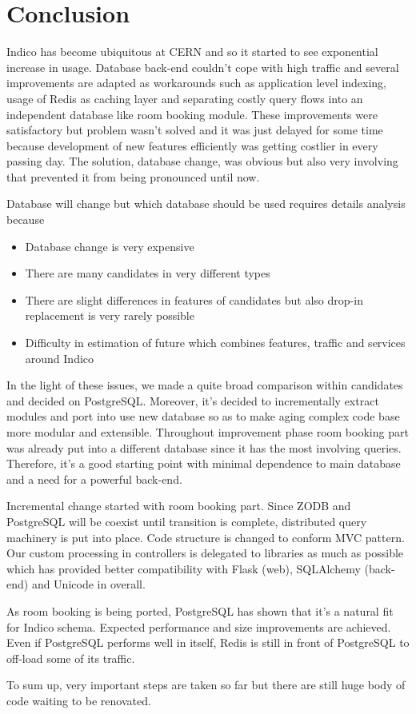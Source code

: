 \chapter{Conclusion}

Indico has become ubiquitous at CERN and so it started to see exponential increase in usage. Database back-end couldn't cope with high traffic and several improvements are adapted as workarounds such as application level indexing, usage of Redis as caching layer and separating costly query flows into an independent database like room booking module. These improvements were satisfactory but problem wasn't solved and it was just delayed for some time because development of new features efficiently was getting costlier in every passing day. The solution, database change, was obvious but also very involving that prevented it from being pronounced until now.

Database will change but which database should be used requires details analysis because 
\begin{itemize}
  \item Database change is very expensive
  \item There are many candidates in very different types
  \item There are slight differences in features of candidates but also drop-in replacement is very rarely possible
  \item Difficulty in estimation of future which combines features, traffic and services around Indico
\end{itemize}

In the light of these issues, we made a quite broad comparison within candidates and decided on PostgreSQL. Moreover, it's decided to incrementally extract modules and port into use new database so as to make aging complex code base more modular and extensible. Throughout improvement phase room booking part was already put into a different database since it has the most involving queries. Therefore, it's a good starting point with minimal dependence to main database and a need for a powerful back-end.

Incremental change started with room booking part. Since ZODB and PostgreSQL will be coexist until transition is complete, distributed query machinery is put into place. Code structure is changed to conform MVC pattern. Our custom processing in controllers is delegated to libraries as much as possible which has provided better compatibility with Flask (web), SQLAlchemy (back-end) and Unicode in overall. 

As room booking is being ported, PostgreSQL has shown that it's a natural fit for Indico schema. Expected performance and size improvements are achieved. Even if PostgreSQL performs well in itself, Redis is still in front of PostgreSQL to off-load some of its traffic.

To sum up, very important steps are taken so far but there are still huge body of code waiting to be renovated.